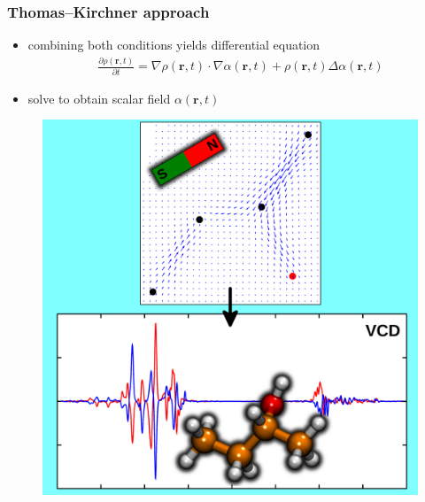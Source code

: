 \documentclass[t]{beamer}
\begin{document}
	\begin{frame}
	    \frametitle{Thomas--Kirchner approach}
        \begin{itemize}
			\item combining both conditions yields differential equation
			\begin{align*}
				\frac{\partial \rho (\mathbf{r},t)}{\partial t} = \nabla \rho (\mathbf{r},t) \cdot \nabla \alpha (\mathbf{r},t) + \rho(\mathbf{r},t) \Delta \alpha(\mathbf{r},t)
			\end{align*}
			\item solve to obtain scalar field $\alpha(\mathbf{r},t)$
		\end{itemize}
		\begin{figure}
            \includegraphics[width=.38\textwidth]{figures/MT_TOC.png}
        \end{figure}
	\end{frame}
\end{document}
